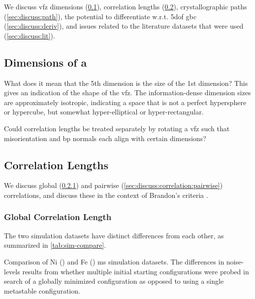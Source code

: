 \documentclass[final,twocolumn,12pt]{elsarticle}
\begin{document}
	We discuss \gls{vfz} dimensions (\cref{sec:discuss:dimensions}), correlation lengths (\cref{sec:discuss:correlation}), crystallographic paths (\cref{sec:discuss:path}), the potential to differentiate w.r.t. \gls{5dof} \gls{gbc} (\cref{sec:discuss:deriv}), and issues related to the literature datasets that were used (\cref{sec:discuss:lit}).
	
	\subsection{Dimensions of a } \label{sec:discuss:dimensions}
	What does it mean that the 5th dimension is \percFiveVsOne{} the size of the 1st dimension? This gives an indication of the shape of the \gls{vfz}. The information-dense dimension sizes are approximately isotropic, indicating a space that is not a perfect hypersphere or hypercube, but somewhat hyper-elliptical or hyper-rectangular.
	
	Could correlation lengths be treated separately by rotating a \gls{vfz} such that misorientation and \gls{bp} normals each align with certain dimensions?
	
	\subsection{Correlation Lengths} \label{sec:discuss:correlation}
    We discuss global (\cref{sec:discuss:correlation:global}) and pairwise (\cref{sec:discuss:correlation:pairwise}) correlations, and discuss these in the context of Brandon's criteria \cite{REF}.

	\subsubsection{Global Correlation Length} \label{sec:discuss:correlation:global}
	The two simulation datasets have distinct differences from each other, as summarized in \cref{tab:sim-compare}.
	\begin{table}[htb!]
	    \centering
	    \caption{Comparison of Ni (\citet{olmstedSurveyComputedGrain2009}) and Fe (\citet{kimPhasefieldModeling3D2014}) \gls{ms} simulation datasets. The differences in noise-levels results from whether multiple initial starting configurations were probed in search of a globally minimized configuration as opposed to using a single metastable configuration. }
\label{tab:sim-compare}
	\end{table}
	
\end{document}
